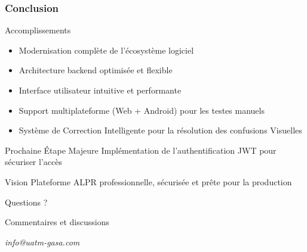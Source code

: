 \documentclass[
	11pt,
	aspectratio=169,
]{beamer}
\begin{document}
\begin{frame}
	\frametitle{Conclusion}
	
	\begin{block}{Accomplissements}
		\begin{itemize}
			\item Modernisation complète de l'écosystème logiciel
			\item Architecture backend optimisée et flexible
			\item Interface utilisateur intuitive et performante
			\item Support multiplateforme (Web + Android) pour les testes manuels
			\item Système de Correction Intelligente pour la résolution
			des confusions Visuelles
		\end{itemize}
	\end{block}
	
	\smallskip
	
	\begin{exampleblock}{Prochaine Étape Majeure}
		\centering
		Implémentation de l'authentification JWT pour sécuriser l'accès
	\end{exampleblock}
	
	\smallskip
	
	\begin{alertblock}{Vision}
		\centering
		Plateforme ALPR professionnelle, sécurisée et prête pour la production
	\end{alertblock}
\end{frame}




\begin{frame}[plain]
	\begin{center}
		{\Huge Questions ?}
		
		\bigskip\bigskip
		
		{\LARGE Commentaires et discussions}
		
		\bigskip\bigskip
		
		\textit{info@uatm-gasa.com}
	\end{center}
\end{frame}

\end{document}
